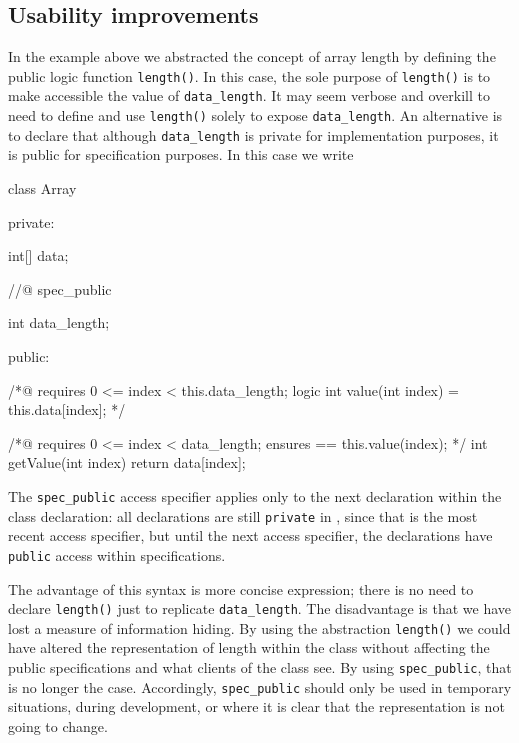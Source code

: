 \subsection{Usability improvements}

In the example above we abstracted the concept of array length by defining the public logic function \lstinline|length()|. 
In this case, the sole purpose of \lstinline|length()| is to make accessible the value of \lstinline|data_length|. It may seem verbose and overkill to need to define and use \lstinline|length()|  solely to expose \lstinline|data_length|. An alternative is to declare
that although \lstinline|data_length| is private for \lang{} implementation purposes, it is public for specification purposes.
In this case we write

\begin{listing-nonumber}
class Array {
	
  private:
	
	int[] data;
	
  //@ spec_public
  
	int data_length;
	
  public:
	
	/*@
	   requires 0 <= index < this.data_length;
	   logic int value(int index) = this.data[index]; 
	*/
	
	/*@ 
	   requires 0 <= index < data_length;
	   ensures \result == this.value(index);
	*/
	int getValue(int index) {
		return data[index];
	}	
}
\end{listing-nonumber}

The \lstinline|spec_public| access specifier applies only to the next declaration within the class declaration: all declarations are still 
\lstinline|private| in \lang{}, since that is the most recent \lang{} access specifier, but until the next access specifier, the declarations have \lstinline|public| access within specifications. 

The advantage of this syntax is more concise expression; there is no need to declare \lstinline|length()| just to replicate \lstinline|data_length|.
The disadvantage is that we have lost a measure of information hiding. By using the abstraction \lstinline|length()| we could
have altered the representation of length within the class without affecting the public specifications and what clients of the class see.
By using \lstinline|spec_public|, that is no longer the case.
Accordingly, \lstinline|spec_public| should only be used in temporary situations, during development, or where it is clear that the representation is not going to change.

